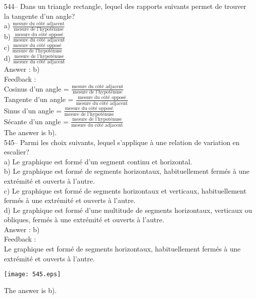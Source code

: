 ﻿\documentclass[letterpaper, 12pt]{article}
\begin{document}
544-- Dans un triangle rectangle, lequel des rapports suivants permet de
trouver la tangente d'un angle?\\[2mm]
a) $\frac{\textrm{mesure du c\^ot\'e adjacent}}{\textrm{mesure de
l'hypot\'enuse}}$\\[2mm]
b) $\frac{\textrm{mesure du c\^ot\'e oppos\'e}}{\textrm{mesure du c\^ot\'e
adjacent}}$\\[2mm]
c) $\frac{\textrm{mesure du c\^ot\'e oppos\'e}}{\textrm{mesure de
l'hypot\'enuse}}$\\[2mm]
d) $\frac{\textrm{mesure de l'hypot\'enuse}}{\textrm{mesure du c\^ot\'e
adjacent}}$\\

Answer : b)\\

Feedback : \\
Cosinus d'un angle = $\frac{\textrm{mesure du c\^ot\'e
adjacent}}{\textrm{mesure de l'hypot\'enuse}}$\\[2mm]
Tangente d'un angle = $\frac{\textrm{mesure du c\^ot\'e
oppos\'e}}{\textrm{mesure du c\^ot\'e adjacent}}$\\[2mm]
Sinus d'un angle = $\frac{\textrm{mesure du c\^ot\'e
oppos\'e}}{\textrm{mesure de l'hypot\'enuse}}$\\[2mm]
S\'ecante d'un angle =  $\frac{\textrm{mesure de
l'hypot\'enuse}}{\textrm{mesure du c\^ot\'e adjacent}}$\\[2mm]
The answer is b).\\

545-- Parmi les choix suivants, lequel s'applique \`a une relation de
variation en escalier?\\
a) Le graphique est form\'e d'un segment continu et horizontal. \\
b) Le graphique est form\'e de segments horizontaux, habituellement ferm\'es
\`a une extr\'emit\'e et ouverts \`a l'autre.\\
c) Le graphique est form\'e de segments horizontaux et verticaux,
habituellement ferm\'es \`a une extr\'emit\'e et ouverts \`a l'autre.\\
d) Le graphique est form\'e d'une multitude de segments horizontaux,
verticaux ou obliques, ferm\'es \`a une extr\'emit\'e et ouverts \`a
l'autre.\\

Answer : b)\\

Feedback : \\
Le graphique est form\'e de segments horizontaux, habituellement ferm\'es
\`a une extr\'emit\'e et ouverts \`a l'autre.
   \begin{center}
    \texttt{[image: 545.eps]}
    \end{center}
The answer is b).\\
\end{document}
